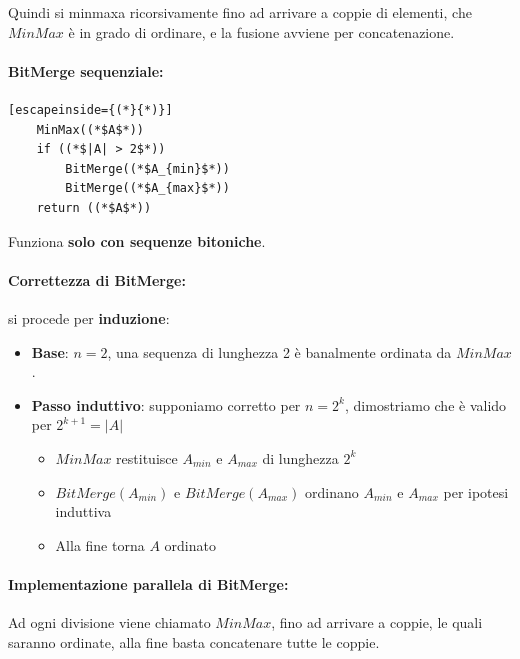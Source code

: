 \documentclass[11pt]{article}
\begin{document}
	Quindi si minmaxa ricorsivamente fino ad arrivare a coppie di elementi, che $MinMax$ è in grado di ordinare, e la fusione avviene per concatenazione.\\
	
	\newpage
	
	\paragraph{BitMerge sequenziale: } \hfill
	
	\begin{lstlisting}[escapeinside={(*}{*)}]
	MinMax((*$A$*))
	if ((*$|A| > 2$*))
		BitMerge((*$A_{min}$*))
		BitMerge((*$A_{max}$*))
	return ((*$A$*))
	\end{lstlisting}
	
	Funziona \textbf{solo con sequenze bitoniche}.\\
	
	\paragraph{Correttezza di BitMerge:} si procede per \textbf{induzione}:
	\begin{itemize}
		\item \textbf{Base}: $n=2$, una sequenza di lunghezza 2 è banalmente ordinata da $MinMax$.\\
		
		\item \textbf{Passo induttivo}: supponiamo corretto per $n=2^k$, dimostriamo che è valido per $2^{k+1} = |A|$
		\begin{itemize}
			\item $MinMax$ restituisce $A_{min}$ e $A_{max}$ di lunghezza $2^k$
			\item $BitMerge(A_{min})$ e $BitMerge(A_{max})$ ordinano $A_{min}$ e $A_{max}$ per ipotesi induttiva
			\item Alla fine torna $A$ ordinato
		\end{itemize}
		\nn
	\end{itemize}
	
	\paragraph{Implementazione parallela di BitMerge:} Ad ogni divisione viene chiamato $MinMax$, fino ad arrivare a coppie, le quali saranno ordinate, alla fine basta concatenare tutte le coppie.\\
	
\end{document}
